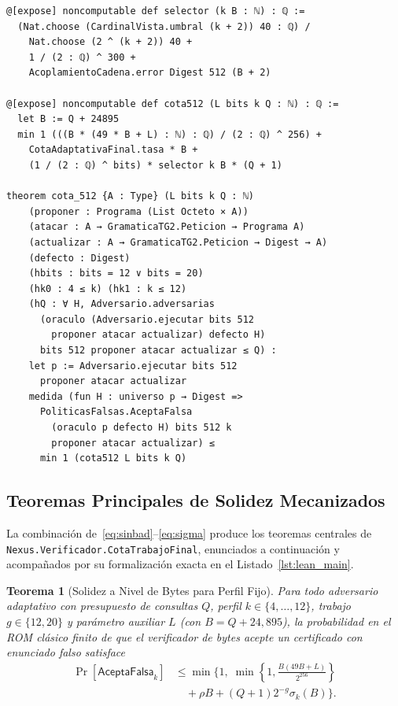 \documentclass[conference]{IEEEtran}
\newtheorem{theorem}{Teorema}
\theoremstyle{definition}
\begin{document}
\begin{lstlisting}[float=t, language=Lean4, caption={Cota principal de solidez mecanizada en Lean~4 (\texttt{CotaTrabajoFinal.lean}).}, label={lst:lean_main}]
@[expose] noncomputable def selector (k B : ℕ) : ℚ :=
  (Nat.choose (CardinalVista.umbral (k + 2)) 40 : ℚ) /
    Nat.choose (2 ^ (k + 2)) 40 +
    1 / (2 : ℚ) ^ 300 +
    AcoplamientoCadena.error Digest 512 (B + 2)

@[expose] noncomputable def cota512 (L bits k Q : ℕ) : ℚ :=
  let B := Q + 24895
  min 1 (((B * (49 * B + L) : ℕ) : ℚ) / (2 : ℚ) ^ 256) +
    CotaAdaptativaFinal.tasa * B +
    (1 / (2 : ℚ) ^ bits) * selector k B * (Q + 1)

theorem cota_512 {A : Type} (L bits k Q : ℕ)
    (proponer : Programa (List Octeto × A))
    (atacar : A → GramaticaTG2.Peticion → Programa A)
    (actualizar : A → GramaticaTG2.Peticion → Digest → A)
    (defecto : Digest)
    (hbits : bits = 12 ∨ bits = 20)
    (hk0 : 4 ≤ k) (hk1 : k ≤ 12)
    (hQ : ∀ H, Adversario.adversarias
      (oraculo (Adversario.ejecutar bits 512
        proponer atacar actualizar) defecto H)
      bits 512 proponer atacar actualizar ≤ Q) :
    let p := Adversario.ejecutar bits 512
      proponer atacar actualizar
    medida (fun H : universo p → Digest =>
      PoliticasFalsas.AceptaFalsa
        (oraculo p defecto H) bits 512 k
        proponer atacar actualizar) ≤
      min 1 (cota512 L bits k Q)
\end{lstlisting}

\subsection{Teoremas Principales de Solidez Mecanizados}
La combinaci\'{o}n de~\eqref{eq:sinbad}--\eqref{eq:sigma} produce los teoremas centrales de \texttt{Nexus.Verificador.CotaTrabajoFinal}, enunciados a continuaci\'{o}n y acompa\~{n}ados por su formalizaci\'{o}n exacta en el Listado~\ref{lst:lean_main}.

\begin{theorem}[Solidez a Nivel de Bytes para Perfil Fijo]
\label{thm:fixed}
Para todo adversario adaptativo con presupuesto de consultas $Q$, perfil $k \in \{4, \dots, 12\}$, trabajo $g \in \{12, 20\}$ y par\'{a}metro auxiliar $L$ (con $B = Q + 24{,}895$), la probabilidad en el ROM cl\'{a}sico finito de que el verificador de bytes acepte un certificado con enunciado falso satisface
\begin{equation}
\label{eq:bound_fixed}
\begin{aligned}
\Pr[\mathsf{AceptaFalsa}_k] &\le \min\biggl\{1,\;
\min\left\{1, \frac{B(49B + L)}{2^{256}}\right\} \\
&\quad + \rho B + (Q + 1)2^{-g}\sigma_k(B)\biggr\}.
\end{aligned}
\end{equation}
\end{theorem}
\end{document}
